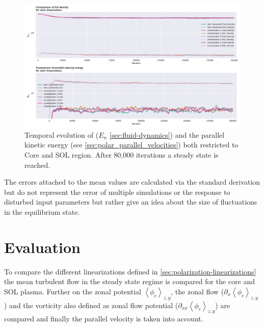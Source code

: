 \documentclass[master.tex]{subfiles}
\newcommand{\meanxy}[1]{\left<#1\right>_{z,y}}
\begin{document}
\begin{figure}[!hbtp]
    \includegraphics[width=\linewidth]{pdfs/equilibrium_state_low.pdf}
    \caption{Temporal evolution of ($E_n$ \autoref{sec:fluid-dynamics}) and the parallel kinetic energy (see \autoref{sec:polar_parallel_velocities}) both restricted to Core and \ac{SOL} region. After 80,000 iterations a steady state is reached.}
\end{figure}


\begin{blockquote}
    The errors attached to the mean values are calculated via the standard derivation but do not represent the error of multiple simulations or the response to disturbed input parameters but rather give an idea about the size of fluctuations in the equilibrium state.
\end{blockquote}
    
\section{Evaluation}
To compare the different linearizations defined in \autoref{sec:polarization-linearizations} the mean turbulent flow in the steady state regime is compared for the core and \ac{SOL} plasma. Further on the zonal potential  $\meanxy{\phi_e}$, the zonal flow ($\partial_x \meanxy{\phi_e}$) and the vorticity also defined as zonal flow potential ($\partial_{xx}\meanxy{\phi_e}$) are compared and finally the parallel velocity is taken into account.
\end{document}
